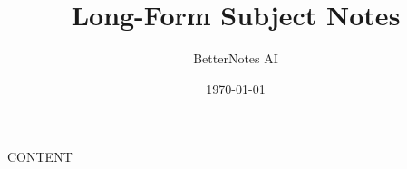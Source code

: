 \documentclass[12pt,a4paper,oneside]{report}
\title{Long-Form Subject Notes}
\author{BetterNotes AI}
\date{\today}
\begin{document}
\maketitle
\tableofcontents
\clearpage

{{CONTENT}}
\end{document}
